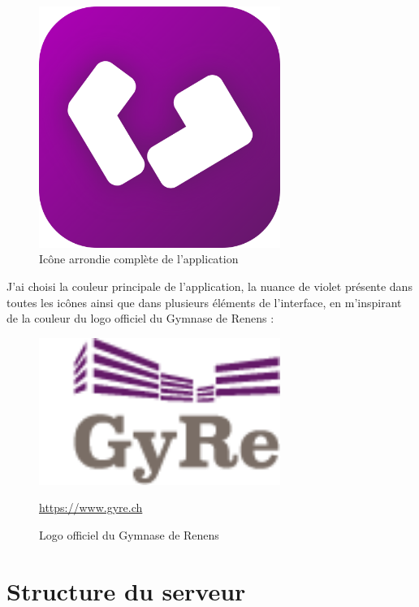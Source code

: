 \documentclass[12pt]{report}
\begin{document}
\begin{figure}[H]
\begin{minipage}[t]{0.32\textwidth}
			\includegraphics[width=0.7\textwidth]{img/rounded_logo_full.png}
			\caption{Icône arrondie complète de l’application}
		\end{minipage}
	\end{figure}
	
	J’ai choisi la couleur principale de l’application, la nuance de violet présente dans toutes les icônes ainsi que dans plusieurs éléments de l’interface, en m’inspirant de la couleur du logo officiel du Gymnase de Renens :
	
	\begin{figure}[H]
		\centering
		\begin{minipage}[t]{0.32\textwidth}
			\centering
			\includegraphics[width=0.7\textwidth]{img/logo_gyre.png}
			\caption{Logo officiel du Gymnase de Renens}
			\url{https://www.gyre.ch}
		\end{minipage}
		\hfill
		
	\end{figure}
	
	\section{Structure du serveur}
	
\end{document}
